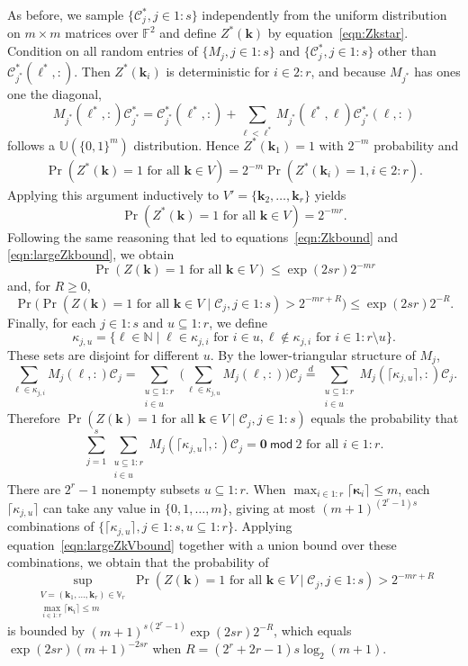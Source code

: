 \documentclass{article}
\theoremstyle{definition}
\renewcommand{\leq}{\leqslant}
\renewcommand{\geq}{\geqslant}
\newcommand{\tmod}{\ \mathsf{mod}\ }
\newcommand{\natu}{\mathbb{N}}
\newcommand{\bsk}{\boldsymbol{k}}
\newcommand{\bszero}{\boldsymbol{0}}
\newcommand{\bskappa}{\boldsymbol{\kappa}}
\newcommand{\dunif}{\mathbb{U}}
\begin{document}
As before, we sample $\{\mathcal{C}^*_j, j\in 1{:}s\}$ independently from the uniform distribution on $m\times m$ matrices over $\mathbb{F}^2$ and define $Z^*(\bsk)$ by equation~\eqref{eqn:Zkstar}. Condition  on all random entries of $\{M_j, j\in 1{:}s\}$ and $\{\mathcal{C}^*_j,j\in 1{:}s\}$ other than $\mathcal{C}^*_{j^*}(\ell^*,:)$. Then $Z^*(\bsk_{i})$ is deterministic for $i\in 2{:}r$,
and because $M_{j^*}$ has ones one the diagonal,
$$M_{j^*}(\ell^*,:)\mathcal{C}^*_{j^*}=\mathcal{C}^*_{j^*}(\ell^*,:)+\sum_{\ell<\ell^*}M_{j^*}(\ell^*,\ell)\mathcal{C}^*_{j^*}(\ell,:)$$
follows a $\dunif(\{0,1\}^m)$ distribution. Hence $Z^*(\bsk_1)=1$ with $2^{-m}$ probability and
\begin{align*}
    \Pr(Z^*(\bsk)=1 \text{ for all }\bsk\in V)=2^{-m}\Pr(Z^*(\bsk_i)=1, i\in 2{:}r ).
\end{align*}
Applying this argument inductively to $V'=\{\bsk_2,\dots,\bsk_r\}$ yields 
$$\Pr(Z^*(\bsk)=1 \text{ for all }\bsk\in V)=2^{-mr}.$$
Following the same reasoning that led to equations~\eqref{eqn:Zkbound} and \eqref{eqn:largeZkbound}, we obtain
$$\Pr(Z(\bsk)=1 \text{ for all }\bsk\in V) \leq \exp(2sr) 2^{-mr}$$
and, for $R\geq 0$,
\begin{equation}\label{eqn:largeZkVbound}
   \Pr\Big(\Pr(Z(\bsk)=1 \text{ for all }\bsk\in V\mid \mathcal{C}_j, j\in 1{:}s)> 2^{-mr+R}\Big)\leq \exp(2sr)2^{-R}. 
\end{equation}
Finally, for each $j\in 1{:}s$ and $u\subseteq 1{:}r$, we define 
$$\kappa_{j,u}=\{\ell\in \natu\mid \ell\in \kappa_{j,i} \text{ for } i\in u, \ell\notin \kappa_{j,i} \text{ for } i\in 1{:}r \setminus u\}.$$
These sets are disjoint for different $u$. By the lower-triangular structure of $M_j$,
$$\sum_{\ell\in \kappa_{j,i}} M_j(\ell,:) \mathcal{C}_j=\sum_{\substack{u\subseteq 1{:}r\\i\in u}}\Big(\sum_{\ell\in \kappa_{j,u}} M_j(\ell,:) \Big)\mathcal{C}_j\overset{d}{=}\sum_{\substack{u\subseteq 1{:}r\\i\in u}} M_j(\lceil\kappa_{j,u}\rceil,:)\mathcal{C}_j.$$
Therefore $\Pr(Z(\bsk)=1 \text{ for all }\bsk\in V\mid \mathcal{C}_j, j\in 1{:}s)$ equals the probability that
$$\sum_{j=1}^s\sum_{\substack{u\subseteq 1{:}r\\i\in u}} M_j(\lceil\kappa_{j,u}\rceil,:)\mathcal{C}_j= \bszero\tmod 2 \text{ for all }i\in 1{:}r.$$
There are $2^r-1$ nonempty subsets $u\subseteq 1{:}r$. When $\max_{i\in 1{:}r}\lceil\bskappa_{i}\rceil\leq m$, each $\lceil\kappa_{j,u}\rceil$ can take any value in $\{0,1,\dots,m\}$, giving at most $(m+1)^{(2^r-1)s}$ combinations of $\{\lceil\kappa_{j,u}\rceil,j\in 1{:}s, u\subseteq 1{:}r\}$. Applying equation~\eqref{eqn:largeZkVbound} together with a union bound over these combinations, we obtain that the probability of
$$\sup_{\substack{V=(\bsk_1,\dots,\bsk_r)\in \mathbb{V}_r\\ \max_{i\in 1{:}r}\lceil\bskappa_{i}\rceil\leq m}}\Pr(Z(\bsk)=1 \text{ for all }\bsk\in V\mid \mathcal{C}_j, j\in 1{:}s)> 2^{-mr+R} $$
is bounded by $(m+1)^{s(2^r-1)}\exp(2sr)2^{-R}$, which equals $\exp(2sr)(m+1)^{-2sr}$ when $R=(2^{r}+2r-1) s\log_2(m+1)$. 
\end{document}
